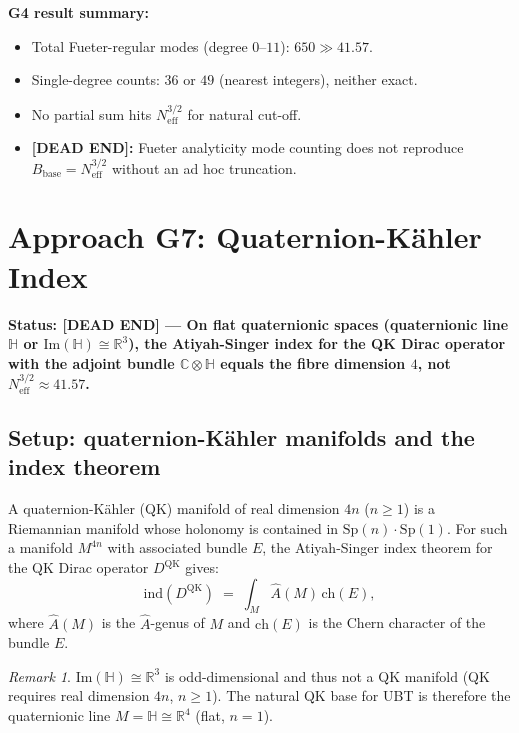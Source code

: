 \documentclass[11pt,a4paper]{article}
\theoremstyle{definition}
\theoremstyle{remark}
\newtheorem{remark}{Remark}
\begin{document}
\textbf{G4 result summary:}
\begin{itemize}
  \item Total Fueter-regular modes (degree $0$--$11$): $650 \gg 41.57$.
  \item Single-degree counts: $36$ or $49$ (nearest integers), neither exact.
  \item No partial sum hits $N_{\mathrm{eff}}^{3/2}$ for natural cut-off.
  \item \textbf{[DEAD END]:} Fueter analyticity mode counting does not
    reproduce $B_{\mathrm{base}} = N_{\mathrm{eff}}^{3/2}$ without an
    ad hoc truncation.
\end{itemize}

\section{Approach G7: Quaternion-Kähler Index}
\label{sec:G7}

\textbf{Status: [DEAD END] — On flat quaternionic spaces (quaternionic line
$\mathbb{H}$ or $\mathrm{Im}(\mathbb{H}) \cong \mathbb{R}^3$),
the Atiyah-Singer index for the QK Dirac operator with the adjoint bundle
$\mathbb{C}\otimes\mathbb{H}$ equals the fibre dimension $4$,
not $N_{\mathrm{eff}}^{3/2} \approx 41.57$.}

\subsection{Setup: quaternion-Kähler manifolds and the index theorem}

A quaternion-Kähler (QK) manifold of real dimension $4n$ ($n \geq 1$) is
a Riemannian manifold whose holonomy is contained in
$\mathrm{Sp}(n)\cdot\mathrm{Sp}(1)$.
For such a manifold $M^{4n}$ with associated bundle $E$, the Atiyah-Singer
index theorem for the QK Dirac operator $D^{\mathrm{QK}}$ gives:
\begin{equation}
  \mathrm{ind}(D^{\mathrm{QK}})
  \;=\; \int_M \hat{A}(M)\,\mathrm{ch}(E),
  \label{eq:QK_index}
\end{equation}
where $\hat{A}(M)$ is the $\hat{A}$-genus of $M$ and $\mathrm{ch}(E)$ is the
Chern character of the bundle $E$.

\begin{remark}
  $\mathrm{Im}(\mathbb{H}) \cong \mathbb{R}^3$ is odd-dimensional and thus
  not a QK manifold (QK requires real dimension $4n$, $n \geq 1$).
  The natural QK base for UBT is therefore the quaternionic line
  $M = \mathbb{H} \cong \mathbb{R}^4$ (flat, $n = 1$).
\end{remark}
\end{document}
